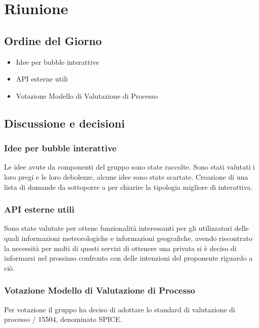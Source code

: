 \section{Riunione}
\subsection{Ordine del Giorno}
\begin{itemize}
	\item Idee per bubble interattive
	\item API esterne utili
	\item Votazione Modello di Valutazione di Processo
\end{itemize}

\subsection{Discussione e decisioni}
\subsubsection{Idee per bubble interattive}
Le idee avute da componenti del gruppo sono state raccolte. Sono stati valutati i loro pregi e le loro debolezze, alcune idee sono state scartate. Creazione di una lista di domande da sottoporre a \Proponente per chiarire la tipologia migliore di  interattiva.

\subsubsection{API esterne utili}
Sono state valutate  per ottene funzionalità interessanti per gli utilizzatori delle  quali informazioni meteorologiche e informazioni geografiche, avendo riscontrato la necessità per molti di questi servizi di ottenere una  privata si è deciso di informarsi nel prossimo confronto con \Proponente delle intenzioni del proponente riguardo a ciò.  

\subsubsection{Votazione Modello di Valutazione di Processo}
Per votazione il gruppo \GroupName{} ha deciso di adottare lo standard di valutazione di processo / 15504, denominato SPICE.

\clearpage
